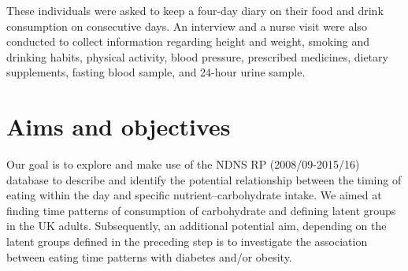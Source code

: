 These individuals were asked to keep a four-day diary on their food and drink consumption on consecutive days. An interview and a nurse visit were also conducted to collect information regarding height and weight, smoking and drinking habits, physical activity, blood pressure, prescribed medicines, dietary supplements, fasting blood sample, and 24-hour urine sample. \vspace{-0.3cm}

\section{Aims and objectives}\vspace{-0.3cm}


Our goal is to explore and make use of the NDNS RP (2008/09-2015/16) database to describe and identify the potential relationship between the timing of eating within the day and specific nutrient--carbohydrate intake. We aimed at finding time patterns of consumption of carbohydrate and defining latent groups in the UK adults. Subsequently, an additional potential aim, depending on the latent groups defined in the preceding step is to investigate the association between eating time patterns with diabetes and/or obesity.

